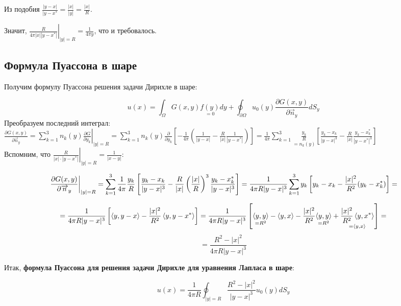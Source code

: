 Из подобия $\frac{|y-x|}{|y-x^*} = \frac{|x|}{|y|} = \frac{|x|}{R}$.

Значит, $\left.\frac{R}{4 \pi |x| |y-x^*|} \right|_{|y|=R} = \frac{1}{4 \pi y}$, что и требовалось.

\subsection{Формула Пуассона в шаре}

Получим формулу Пуассона решения задачи Дирихле в шаре:

$$u(x) = \int_{\Omega}{G(x,y) \underset{=0}{f(y)} dy} +
\oint_{\partial \Omega}{u_0(y) \frac{\partial G(x,y)}
{\partial \overrightarrow{n}_y}dS_y}
$$
Преобразуем последний интеграл:\\

$
\frac{\partial G(x,y)}{\partial \overrightarrow{n}_y}=
\sum_{k=1}^{3}{n_k(y) \left. \frac{\partial G}{\partial y_k} \right|_{|y|=R}}=
\sum_{k=1}^{3}{n_k(y)\frac{\partial}{\partial y_k}\left[
-\frac{1}{4\pi}\left(\frac{1}{|y-x|}-\frac{R}{|x|}\frac{1}{|y-x^*|}\right)
\right]} 
=
\frac{1}{4 \pi}  \sum_{k=1}^{3}\underset{=n_k(y)}{\frac{y_k}{R}}\left[ \frac{y_k-x_k}{|y-x|^3} - \frac{R}{|x|}  \frac{y_k-x_k^*}{|y-x^*|^3} \right]
$\\

Вспомним, что $\left.\frac{R}{|x|\cdot|y-x^*|}\right|_{|y|=R} =
\frac{1}{|x-y|}$:

$$
\left. \frac{\partial G(x,y)}{\partial \overrightarrow{n}_y} \right|_{|y|=R} 
=
\sum_{k=1}^{3}{\frac{1}{4 \pi} \frac{y_k}{R}
\left[ \frac{y_k-x_k}{|y-x|^3} -\frac{R}{|x|}\left(\frac{|x|}{R}\right)^3
\frac{y_k - x_k^*}{|y-x|^3} \right] }
=
\frac{1}{4 \pi R |y-x|^3} \sum_{k=1}^{3}{y_k \left[y_k-x_k-\frac{|x|^2}{R^2}(y_k - x_k^*)\right]}
=
$$

$$
=
\frac{1}{4 \pi R |y-x|^3} \left[\left\langle y,y-x \right\rangle - \frac{|x|^2}{R^2}
\left\langle y,y-x^* \right\rangle\right]
=
\frac{1}{4 \pi R |y-x|^3} \left[\underset{=R^2}{\left\langle y,y \right\rangle} - \left\langle y,x \right\rangle
-\frac{|x|^2}{R^2}\underset{=R^2}{\left\langle y,y \right\rangle}+ \underset{=\left\langle y,x \right\rangle}{\frac{|x|^2}{R^2} \left\langle y,x^* \right\rangle}  \right]
= $$ 
$$
=\frac{R^2 - |x|^2}{4 \pi R |y-x|^3}
$$

Итак, \textbf{формула Пуассона для решения задачи Дирихле для уравнения Лапласа в шаре}:

$$
u(x) = \frac{1}{4 \pi R} \oint_{|y|=R}{\frac{R^2-|x|^2}{|y-x|^3}u_0(y) dS_y}
$$


